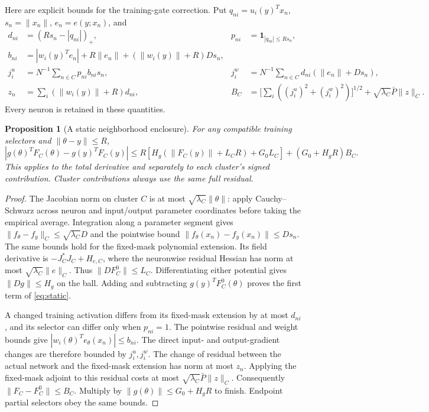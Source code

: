 \documentclass[10pt]{article}
\newtheorem{proposition}[theorem]{Proposition}
\begin{document}
Here are explicit bounds for the training-gate correction. Put
$q_{ni}=u_i(y)^Tx_n$, $s_n=\|x_n\|$, $e_n=e(y;x_n)$, and
\begin{align*}
 d_{ni}&=(Rs_n-|q_{ni}|)_+,&
 p_{ni}&=\mathbf1_{|q_{ni}|\le Rs_n},\\
 b_{ni}&=|w_i(y)^Te_n|+R\|e_n\|
                 +(\|w_i(y)\|+R)Ds_n,\\
 j_i^u&=N^{-1}\sum_{n\in C}p_{ni}b_{ni}s_n,&
 j_i^w&=N^{-1}\sum_{n\in C}d_{ni}(\|e_n\|+Ds_n),\\
 z_n&=\sum_i(\|w_i(y)\|+R)d_{ni},&
 B_C&=\Big[\sum_i((j_i^u)^2+(j_i^w)^2)\Big]^{1/2}
                  +\sqrt{\lambda_C}\bar P\|z\|_C.
\end{align*}
Every neuron is retained in these quantities.

\begin{proposition}[A static neighborhood enclosure]\label{prop:static}
For any compatible training selectors and $\|\theta-y\|\le R$,
\begin{equation}\label{eq:static}
 \left|g(\theta)^TF_C(\theta)-g(y)^TF_C(y)\right|
 \le R\left[H_g(\|F_C(y)\|+L_CR)+G_0L_C\right]
                   +(G_0+H_gR)B_C.
\end{equation}
This applies to the total derivative and separately to each cluster's
signed contribution. Cluster contributions always use the same full residual.
\end{proposition}
\begin{proof}
The Jacobian norm on cluster $C$ is at most
$\sqrt{\lambda_C}\|\theta\|$: apply Cauchy--Schwarz across neuron and
input/output parameter coordinates before taking the empirical average.
Integration along a parameter segment gives
$\|f_\theta-f_y\|_C\le\sqrt{\lambda_C}D$ and the pointwise bound
$\|f_\theta(x_n)-f_y(x_n)\|\le Ds_n$.
The same bounds hold for the fixed-mask polynomial extension.
Its field derivative is $-J_C^*J_C+H_{e,C}$, where the neuronwise
residual Hessian has norm at most
$\sqrt{\lambda_C}\|e\|_C$. Thus
$\|DF_C^0\|\le L_C$. Differentiating either potential gives
$\|Dg\|\le H_g$ on the ball. Adding and subtracting
$g(y)^TF_C^0(\theta)$ proves the first term of \eqref{eq:static}.

A changed training activation differs from its fixed-mask extension by at
most $d_{ni}$, and its selector can differ only when $p_{ni}=1$.
The pointwise residual and weight bounds give
$|w_i(\theta)^Te_\theta(x_n)|\le b_{ni}$. The direct input- and
output-gradient changes are therefore bounded by $j_i^u,j_i^w$.
The change of residual between the actual network and the fixed-mask
extension has norm at most $z_n$. Applying the fixed-mask adjoint to
this residual costs at most $\sqrt{\lambda_C}\bar P\|z\|_C$.
Consequently $\|F_C-F_C^0\|\le B_C$. Multiply by
$\|g(\theta)\|\le G_0+H_gR$ to finish. Endpoint partial selectors obey
the same bounds.
\end{proof}
\end{document}
